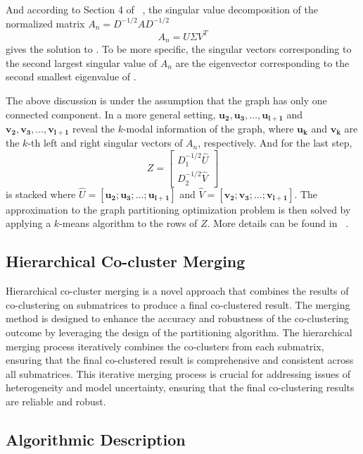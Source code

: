 \documentclass[journal]{IEEEtran}
\renewcommand{\cite}[1]{~\autocite{#1}}
\begin{document}
And according to Section 4 of \cite{dhillon2001CoclusteringDocumentsWords}, the singular value decomposition of the normalized matrix $A_n = D^{-1/2} A D^{-1/2}$
$$A_n = U \Sigma V^T$$
gives the solution to . To be more specific, the singular vectors corresponding to the second largest singular value of $A_n$ are the eigenvector corresponding to the second smallest eigenvalue of .

The above discussion is under the assumption that the graph has only one connected component. In a more general setting, $\mathbf{u_2}, \mathbf{u_3}, \ldots, \mathbf{u_{l+1}}$ and $\mathbf{v_2}, \mathbf{v_3}, \ldots, \mathbf{v_{l+1}}$ reveal the $k$-modal information of the graph, where $\mathbf{u_k}$ and $\mathbf{v_k}$ are the $k$-th left and right singular vectors of $A_n$, respectively. And for the last step,
$$ Z = \begin{bmatrix} D_1^{-1/2} \hat{U} \\ D_2^{-1/2} \hat{V} \end{bmatrix} $$
is stacked where $\hat{U} = [\mathbf{u_2}; \mathbf{u_3}; \ldots; \mathbf{u_{l+1}}]$ and $\hat{V} = [\mathbf{v_2}; \mathbf{v_3}; \ldots; \mathbf{v_{l+1}}]$. The approximation to the graph partitioning optimization problem is then solved by applying a $k$-means algorithm to the rows of $Z$. More details can be found in \cite{dhillon2001CoclusteringDocumentsWords}.

\subsection{Hierarchical Co-cluster Merging}

Hierarchical co-cluster merging is a novel approach that combines the results of co-clustering on submatrices to produce a final co-clustered result. The merging method is designed to enhance the accuracy and robustness of the co-clustering outcome by leveraging the design of the partitioning algorithm. The hierarchical merging process iteratively combines the co-clusters from each submatrix, ensuring that the final co-clustered result is comprehensive and consistent across all submatrices. This iterative merging process is crucial for addressing issues of heterogeneity and model uncertainty, ensuring that the final co-clustering results are reliable and robust.

\subsection{Algorithmic Description}
\end{document}
